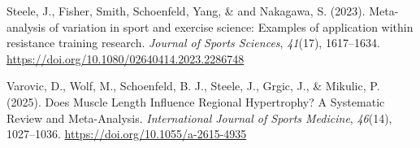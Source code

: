 \documentclass[
]{article}
\newlength{\cslhangindent}
\newenvironment{CSLReferences}[2] %
 {\begin{list}{}{%
  \setlength{\itemindent}{0pt}
  \setlength{\leftmargin}{0pt}
  \setlength{\parsep}{0pt}
  \ifodd #1
   \setlength{\leftmargin}{\cslhangindent}
   \setlength{\itemindent}{-1\cslhangindent}
  \fi
  \setlength{\itemsep}{#2\baselineskip}}}
 {\end{list}}
\begin{document}
\begin{CSLReferences}{1}{0}
Steele, J., Fisher, Smith, Schoenfeld, Yang, \& and Nakagawa, S. (2023).
Meta-analysis of variation in sport and exercise science: {Examples} of
application within resistance training research. \emph{Journal of Sports
Sciences}, \emph{41}(17), 1617--1634.
\url{https://doi.org/10.1080/02640414.2023.2286748}

Varovic, D., Wolf, M., Schoenfeld, B. J., Steele, J., Grgic, J., \&
Mikulic, P. (2025). Does {Muscle Length Influence Regional Hypertrophy}?
{A Systematic Review} and {Meta-Analysis}. \emph{International Journal
of Sports Medicine}, \emph{46}(14), 1027--1036.
\url{https://doi.org/10.1055/a-2615-4935}

\end{CSLReferences}
\end{document}
